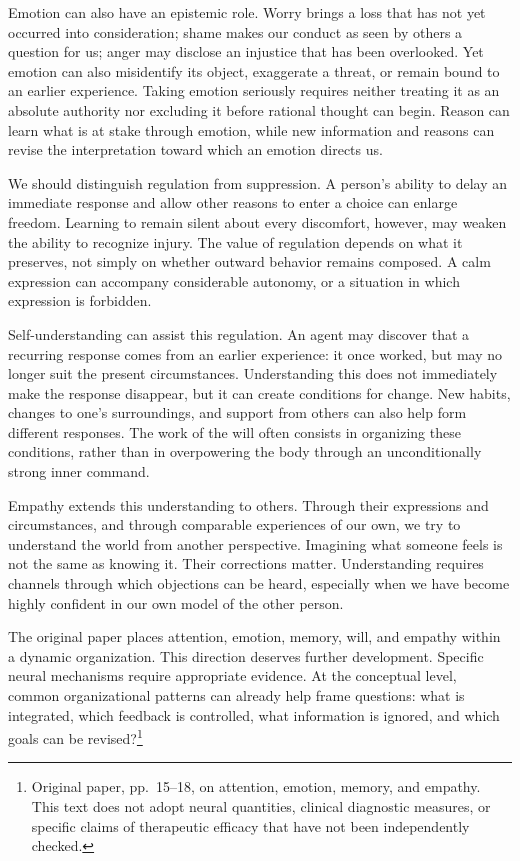 \documentclass[
  english,
  11pt,
  oneside]{book}
\begin{document}
Emotion can also have an epistemic role. Worry brings a loss that has not yet occurred into consideration; shame makes our conduct as seen by others a question for us; anger may disclose an injustice that has been overlooked. Yet emotion can also misidentify its object, exaggerate a threat, or remain bound to an earlier experience. Taking emotion seriously requires neither treating it as an absolute authority nor excluding it before rational thought can begin. Reason can learn what is at stake through emotion, while new information and reasons can revise the interpretation toward which an emotion directs us.

We should distinguish regulation from suppression. A person's ability to delay an immediate response and allow other reasons to enter a choice can enlarge freedom. Learning to remain silent about every discomfort, however, may weaken the ability to recognize injury. The value of regulation depends on what it preserves, not simply on whether outward behavior remains composed. A calm expression can accompany considerable autonomy, or a situation in which expression is forbidden.

Self-understanding can assist this regulation. An agent may discover that a recurring response comes from an earlier experience: it once worked, but may no longer suit the present circumstances. Understanding this does not immediately make the response disappear, but it can create conditions for change. New habits, changes to one's surroundings, and support from others can also help form different responses. The work of the will often consists in organizing these conditions, rather than in overpowering the body through an unconditionally strong inner command.

Empathy extends this understanding to others. Through their expressions and circumstances, and through comparable experiences of our own, we try to understand the world from another perspective. Imagining what someone feels is not the same as knowing it. Their corrections matter. Understanding requires channels through which objections can be heard, especially when we have become highly confident in our own model of the other person.

The original paper places attention, emotion, memory, will, and empathy within a dynamic organization. This direction deserves further development. Specific neural mechanisms require appropriate evidence. At the conceptual level, common organizational patterns can already help frame questions: what is integrated, which feedback is controlled, what information is ignored, and which goals can be revised?\footnote{\hypertarget{ph-note-53}{}Original paper, pp.~15--18, on attention, emotion, memory, and empathy. This text does not adopt neural quantities, clinical diagnostic measures, or specific claims of therapeutic efficacy that have not been independently checked.}
\end{document}
